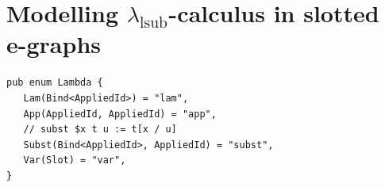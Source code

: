 \section{Modelling $\lambda_{\text{lsub}}$-calculus in slotted e-graphs}%
\label{sec:e-graph-explicit-subst}


\begin{listing}
	\begin{verbatim}
pub enum Lambda {
   Lam(Bind<AppliedId>) = "lam",
   App(AppliedId, AppliedId) = "app",
   // subst $x t u := t[x / u]
   Subst(Bind<AppliedId>, AppliedId) = "subst",
   Var(Slot) = "var",
}
	\end{verbatim}
	\caption{$\lambda_{\text{lsub}}$ syntax definition in slotted e-graphs}
	\label{listing:define_language}
\end{listing}


